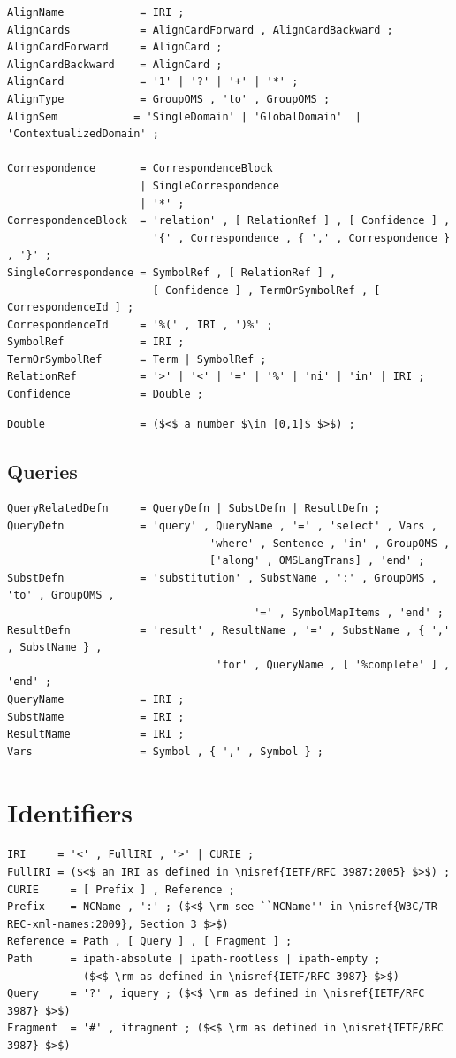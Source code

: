 \documentclass[10pt,fleqn,%
\ifpretendfinal
final%
\else
draft%
\fi,
]{scrreprt}
\newcommand{\sclause}[1]{\section{#1}}
\newcommand{\ssclause}[1]{\subsection{#1}}
\newcommand{\nisref}[1]{#1}
\begin{document}
\begin{lstlisting}[language=ebnf,mathescape]
AlignName            = IRI ;
AlignCards           = AlignCardForward , AlignCardBackward ;
AlignCardForward     = AlignCard ;
AlignCardBackward    = AlignCard ;
AlignCard            = '1' | '?' | '+' | '*' ;
AlignType            = GroupOMS , 'to' , GroupOMS ;
AlignSem            = 'SingleDomain' | 'GlobalDomain'  | 'ContextualizedDomain' ;

Correspondence       = CorrespondenceBlock
                     | SingleCorrespondence
                     | '*' ;
CorrespondenceBlock  = 'relation' , [ RelationRef ] , [ Confidence ] , 
                       '{' , Correspondence , { ',' , Correspondence } , '}' ;
SingleCorrespondence = SymbolRef , [ RelationRef ] ,
                       [ Confidence ] , TermOrSymbolRef , [ CorrespondenceId ] ;
CorrespondenceId     = '%(' , IRI , ')%' ;
SymbolRef            = IRI ;
TermOrSymbolRef      = Term | SymbolRef ;
RelationRef          = '>' | '<' | '=' | '%' | 'ni' | 'in' | IRI ;
Confidence           = Double ; 
\end{lstlisting}
\begin{lstlisting}[language=ebnf,escapeinside={()}]
Double               = ($<$ a number $\in [0,1]$ $>$) ;
\end{lstlisting}

\ssclause{Queries}

\begin{lstlisting}[language=ebnf,escapeinside={<>},mathescape]
QueryRelatedDefn     = QueryDefn | SubstDefn | ResultDefn ;
QueryDefn            = 'query' , QueryName , '=' , 'select' , Vars , 
                                'where' , Sentence , 'in' , GroupOMS , 
                                ['along' , OMSLangTrans] , 'end' ;
SubstDefn            = 'substitution' , SubstName , ':' , GroupOMS , 'to' , GroupOMS , 
                                       '=' , SymbolMapItems , 'end' ;
ResultDefn           = 'result' , ResultName , '=' , SubstName , { ',' , SubstName } ,
                                 'for' , QueryName , [ '%complete' ] , 'end' ;
QueryName            = IRI ;
SubstName            = IRI ;
ResultName           = IRI ;
Vars                 = Symbol , { ',' , Symbol } ;
\end{lstlisting}

\sclause{Identifiers}

\begin{lstlisting}[language=ebnf,escapeinside={()}]
IRI     = '<' , FullIRI , '>' | CURIE ;
FullIRI = ($<$ an IRI as defined in \nisref{IETF/RFC 3987:2005} $>$) ;
CURIE     = [ Prefix ] , Reference ;
Prefix    = NCName , ':' ; ($<$ \rm see ``NCName'' in \nisref{W3C/TR REC-xml-names:2009}, Section 3 $>$) 
Reference = Path , [ Query ] , [ Fragment ] ;
Path      = ipath-absolute | ipath-rootless | ipath-empty ;
            ($<$ \rm as defined in \nisref{IETF/RFC 3987} $>$) 
Query     = '?' , iquery ; ($<$ \rm as defined in \nisref{IETF/RFC 3987} $>$) 
Fragment  = '#' , ifragment ; ($<$ \rm as defined in \nisref{IETF/RFC 3987} $>$) 
\end{lstlisting}
\end{document}
